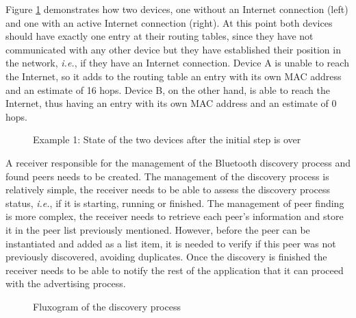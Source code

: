Figure \ref{fig:adveg1} demonstrates how two devices, one without an Internet connection (left) and one with an active Internet connection (right). At this point both devices should have exactly one entry at their routing tables, since they have not communicated with any other device but they have established their position in the network, \textit{i.e.}, if they have an Internet connection. Device A is unable to reach the Internet, so it adds to the routing table an entry with its own \gls{MAC} address and an estimate of 16 hops. Device B, on the other hand, is able to reach the Internet, thus having an entry with its own \gls{MAC} address and an estimate of 0 hops.

\begin{figure}[ht]
   \noindent{}
	\caption{\label{fig:adveg1} Example 1: State of the two devices after the initial step is over}
\end{figure}

A receiver responsible for the management of the Bluetooth discovery process and found peers needs to be created. The management of the discovery process is relatively simple, the receiver needs to be able to assess the discovery process status, \textit{i.e.}, if it is starting, running or finished. The management of peer finding is more complex, the receiver needs to retrieve each peer's information and store it in the peer list previously mentioned. However, before the peer can be instantiated and added as a list item, it is needed to verify if this peer was not previously discovered, avoiding duplicates. Once the discovery is finished the receiver needs to be able to notify the rest of the application that it can proceed with the advertising process.

\begin{figure}[ht]
   \noindent{}
	\caption{\label{fig:discflux} Fluxogram of the discovery process}
\end{figure}

